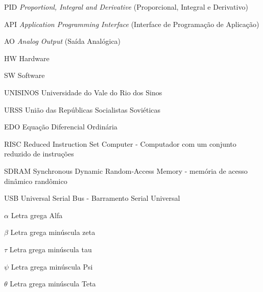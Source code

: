 \listoffigures*
\cleardoublepage
\listoftables*
\cleardoublepage
\begin{siglas}
\item[PID] \textit{Proportionl, Integral and Derivative} (Proporcional, Integral e Derivativo)
\item[API] \textit{Application Programming Interface} (Interface de Programação de Aplicação)
\item[AO] \textit{Analog Output} (Saída Analógica)
\item[HW] Hardware
\item[SW] Software
\item[UNISINOS] Universidade do Vale do Rio dos Sinos
\item[URSS] União das Repúblicas Socialistas Soviéticas
\item[EDO] Equação Diferencial Ordinária
\item[RISC] Reduced Instruction Set Computer - Computador com um conjunto reduzido de instruções
\item[SDRAM] Synchronous Dynamic Random-Access Memory - memória de acesso dinâmico randômico
\item[USB]  Universal Serial Bus - Barramento Serial Universal

\end{siglas}
\begin{simbolos}
  \item[$ \alpha $] Letra grega Alfa
  \item[$ \beta $] Letra grega minúscula zeta
  \item[$ \tau $] Letra grega minúscula tau
  \item[$ \psi $] Letra grega minúscula Psi
  \item[$ \theta $] Letra grega minúscula Teta
\end{simbolos}